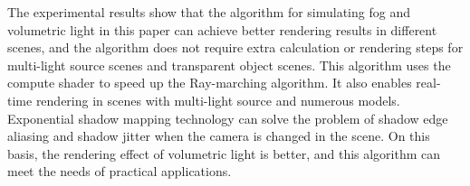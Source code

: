 {The experimental results show that the algorithm for simulating fog and volumetric light in this paper can achieve better rendering results in different scenes, and the algorithm does not require extra calculation or rendering steps for multi-light source scenes and transparent object scenes. This algorithm uses the compute shader to speed up the Ray-marching algorithm. It also enables real-time rendering in scenes with multi-light source and numerous models. Exponential shadow mapping technology can solve the problem of shadow edge aliasing and shadow jitter when the camera is changed in the scene. On this basis, the rendering effect of volumetric light is better, and this algorithm can meet the needs of practical applications.


}
